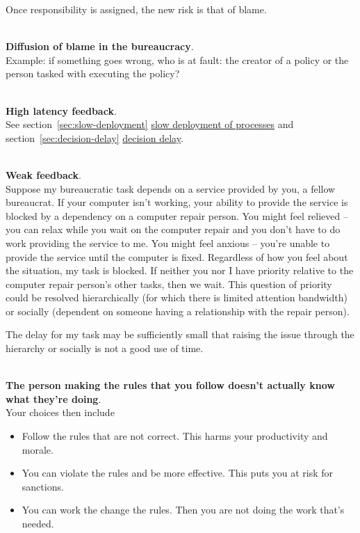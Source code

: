 Once responsibility is assigned, the new risk is that of blame.

\ \\

\textbf{Diffusion of blame in the bureaucracy}. \\
Example: if something goes wrong, who is at fault: the creator of a policy or the person tasked with executing the policy?

\ \\

\textbf{High latency feedback}. \\
See 
\ifsectionref
section~\ref{sec:slow-deployment} 
\fi
\hyperref[sec:slow-deployment]{slow deployment of processes} and 
\ifsectionref
section~\ref{sec:decision-delay} 
\fi
 \hyperref[sec:decision-delay]{decision delay}.

\ \\

\textbf{Weak feedback}. \\
Suppose my bureaucratic task depends on a service provided by you, a fellow bureaucrat. If your computer isn't working, your ability to provide the service is blocked by a dependency on a computer repair person. You might feel relieved -- you can relax while you wait on the computer repair and you don't have to do work providing the service to me. You might feel anxious -- you're unable to provide the service until the computer is fixed. Regardless of how you feel about the situation, my task is blocked. If neither you nor I have priority relative to the computer repair person's other tasks, then we wait. This question of priority could be resolved hierarchically (for which there is limited attention bandwidth) or socially (dependent on someone having a relationship with the repair person). 

The delay for my task may be sufficiently small that raising the issue through the hierarchy or socially is not a good use of time.

\ \\

\textbf{The person making the rules that you follow doesn't actually know what they're doing}. \\
Your choices then include
\begin{itemize}
    \item Follow the rules that are not correct. This harms your productivity and morale. 
\item You can violate the rules and be more effective. This puts you at risk for sanctions. 
\item You can work the change the rules. Then you are not doing the work that's needed.
\end{itemize}


